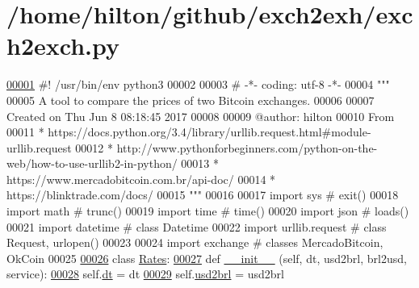 \hypertarget{exch2exch_8py_source}{}\section{/home/hilton/github/exch2exh/exch2exch.py}

\begin{DoxyCode}
\hypertarget{exch2exch_8py_source.tex_l00001}{}\hyperlink{namespaceexch2exch}{00001} \textcolor{comment}{#! /usr/bin/env python3 }
00002 
00003 \textcolor{comment}{# -*- coding: utf-8 -*-}
00004 \textcolor{stringliteral}{"""}
00005 \textcolor{stringliteral}{A tool to compare the prices of two Bitcoin exchanges. }
00006 \textcolor{stringliteral}{}
00007 \textcolor{stringliteral}{Created on Thu Jun  8 08:18:45 2017}
00008 \textcolor{stringliteral}{}
00009 \textcolor{stringliteral}{@author: hilton}
00010 \textcolor{stringliteral}{From }
00011 \textcolor{stringliteral}{* https://docs.python.org/3.4/library/urllib.request.html#module-urllib.request}
00012 \textcolor{stringliteral}{* http://www.pythonforbeginners.com/python-on-the-web/how-to-use-urllib2-in-python/}
00013 \textcolor{stringliteral}{* https://www.mercadobitcoin.com.br/api-doc/}
00014 \textcolor{stringliteral}{* https://blinktrade.com/docs/}
00015 \textcolor{stringliteral}{"""}
00016 
00017 \textcolor{keyword}{import} sys            \textcolor{comment}{# exit()}
00018 \textcolor{keyword}{import} math           \textcolor{comment}{# trunc()  }
00019 \textcolor{keyword}{import} time           \textcolor{comment}{# time()  }
00020 \textcolor{keyword}{import} json           \textcolor{comment}{# loads()  }
00021 \textcolor{keyword}{import} datetime       \textcolor{comment}{# class Datetime  }
00022 \textcolor{keyword}{import} urllib.request \textcolor{comment}{# class Request, urlopen()}
00023 
00024 \textcolor{keyword}{import} exchange       \textcolor{comment}{# classes MercadoBitcoin, OkCoin}
00025 
\hypertarget{exch2exch_8py_source.tex_l00026}{}\hyperlink{classexch2exch_1_1_rates}{00026} \textcolor{keyword}{class }\hyperlink{classexch2exch_1_1_rates}{Rates}:
\hypertarget{exch2exch_8py_source.tex_l00027}{}\hyperlink{classexch2exch_1_1_rates_a2868d5631b08e767680f1d0cd0a6420a}{00027}     \textcolor{keyword}{def }\hyperlink{classexch2exch_1_1_rates_a2868d5631b08e767680f1d0cd0a6420a}{\_\_init\_\_} (self, dt, usd2brl, brl2usd, service):
\hypertarget{exch2exch_8py_source.tex_l00028}{}\hyperlink{classexch2exch_1_1_rates_acb12f83bce4393714ec30351a1d636c2}{00028}         self.\hyperlink{classexch2exch_1_1_rates_acb12f83bce4393714ec30351a1d636c2}{dt}  = dt
\hypertarget{exch2exch_8py_source.tex_l00029}{}\hyperlink{classexch2exch_1_1_rates_ab79ad6e4a42ca358e6b39c825a4b8a0b}{00029}         self.\hyperlink{classexch2exch_1_1_rates_ab79ad6e4a42ca358e6b39c825a4b8a0b}{usd2brl} = usd2brl

\end{DoxyCode}
